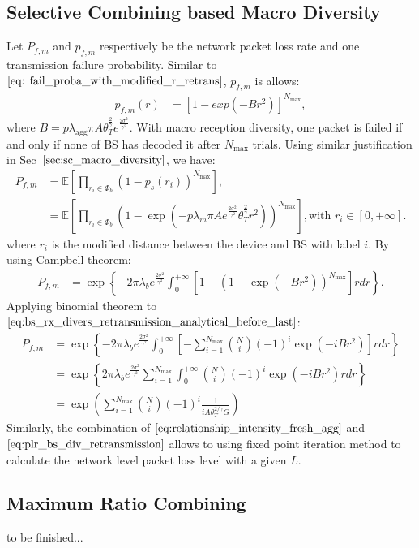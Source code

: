 \subsection{Selective Combining based Macro Diversity}
Let $P_{f, m}$ and $p_{f, m}$ respectively be the network packet loss rate and one transmission failure probability. Similar to $\eqref{eq: fail_proba_with_modified_r_retrans}$,  $p_{f, m}$ is allows:
\begin{align}
\label{eq: fail_proba_with_modified_r_retrans_macro_diversity}
p_{f, m}(r)
&= \left[ 1 - exp(-B {r} ^ 2)\right] ^{N_{\text{max}}},
\end{align} 
where $B = p \lambda_{\text{agg}} \pi A \theta_{T}^{\frac{2}{\gamma}} e^{\frac{2\sigma^2}{\gamma^2}} $.
With macro reception diversity, one packet is failed if and only if none of BS has decoded it after $N_{\text{max}}$ trials. Using similar justification in Sec~$\ref{sec:sc_macro_diversity}$, we have:
\begin{align}
\label{eq:definition_pfm_retransmission}
P_{f,m} &= \mathbb{E}\left[  \prod_{r_i \in \Phi_{b}} (1-p_{s}(r_i))^{N_{\text{max}}} \right], \nonumber\\
& = \mathbb{E}\left[  \prod_{r_i \in \Phi_{b}} ( 1 - \exp(-p \lambda_{m} \pi A e^{\frac{2\sigma^2}{\gamma^2}} \theta_{T}^{\frac{2}{\gamma}} r^2 ) )^{N_{\text{max}}} \right], \text{with } r_i \in \left[0, +\infty\right].
\end{align} 
where $r_i$ is the modified distance between the device and BS with label $i$. By using Campbell theorem:
\begin{align}
\label{eq:bs_rx_divers_retransmission_analytical_before_last}
P_{f,m} &= \exp\left\lbrace -2\pi \lambda_{b} e^{\frac{2\sigma^2}{\gamma^2}}\int_{0}^{+\infty} \left[  1 - \left( 1-\exp(-Br^2) \right) ^{N_{\text{max}}} \right]  rdr \right\rbrace.
\end{align}
Applying binomial theorem to $\eqref{eq:bs_rx_divers_retransmission_analytical_before_last}$:
\begin{align}
	\label{eq:plr_bs_div_retransmission}
	P_{f,m} &= \exp\left\lbrace -2\pi \lambda_{b} e^{\frac{2\sigma^2}{\gamma^2}}\int_{0}^{+\infty} \left[ -\sum_{i=1}^{N_{\text{max}}} \binom{N}{i} (-1)^i \exp(-iBr^2) \right] rdr \right\rbrace \nonumber\\
	&= \exp\left\lbrace 2\pi \lambda_{b} e^{\frac{2\sigma^2}{\gamma^2}} \sum_{i=1}^{N_{\text{max}}} \int_{0}^{+\infty} \binom{N}{i} (-1)^i \exp(-iBr^2) rdr \right\rbrace \nonumber\\
	&= \exp(\sum_{i=1}^{N_{\text{max}}} \binom{N}{i} (-1)^{i} \frac{1 }{i A \theta_T^{2/\gamma} G })
\end{align}
Similarly, the combination of $\eqref{eq:relationship_intensity_fresh_agg}$ and $\eqref{eq:plr_bs_div_retransmission}$ allows to using fixed point iteration method to calculate the network level packet loss level with a given $L$.

\subsection{Maximum Ratio Combining}
to be finished...